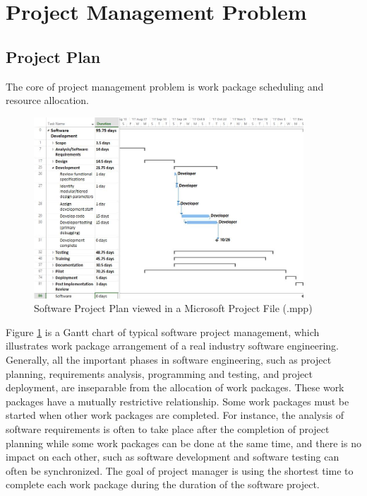 
\section{Project Management Problem}
%

\subsection{Project Plan}
%

The core of project management problem is work package scheduling and resource
allocation.

\begin{figure}[!ht]
  \centering
  \includegraphics[width=0.9\textwidth]{figures/pm_sample.jpg}
  \caption{Software Project Plan viewed in a Microsoft Project File (.mpp)}
  \label{fig:sample}
\end{figure}


Figure \ref{fig:sample} is a Gantt chart of typical software project management, which
illustrates work package arrangement of a real industry software engineering.
Generally, all the important phases in software engineering, such as project
planning, requirements analysis, programming and testing, and project
deployment, are inseparable from the allocation of work packages.  These work
packages have a mutually restrictive relationship. Some work packages must be
started when other work packages are completed. For instance, the analysis of
software requirements is often to take place after the completion of project planning
while some work packages can be done at the same time, and there is no
impact on each other, such as software development and software testing can
often be synchronized. The goal of project manager is using the shortest time
to complete each work package during the duration of the software project.


